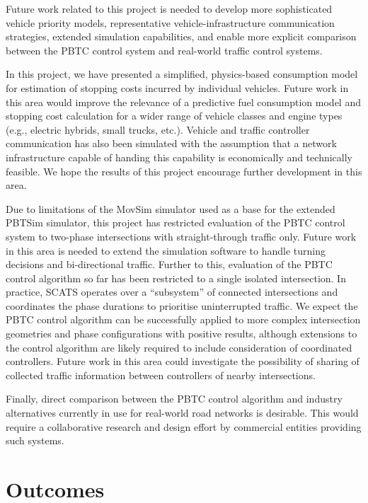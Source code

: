 Future work related to this project is needed to develop more sophisticated vehicle priority models, representative vehicle-infrastructure communication strategies, extended simulation capabilities, and enable more explicit comparison between the PBTC control system and real-world traffic control systems.

In this project, we have presented a simplified, physics-based consumption model for estimation of stopping costs incurred by individual vehicles. Future work in this area would improve the relevance of a predictive fuel consumption model and stopping cost calculation for a wider range of vehicle classes and engine types (e.g., electric hybrids, small trucks, etc.). Vehicle and traffic controller communication has also been simulated with the assumption that a network infrastructure capable of handing this capability is economically and technically feasible. We hope the results of this project encourage further development in this area.

Due to limitations of the MovSim simulator used as a base for the extended PBTSim simulator, this project has restricted evaluation of the PBTC control system to two-phase intersections with straight-through traffic only. Future work in this area is needed to extend the simulation software to handle turning decisions and bi-directional traffic. Further to this, evaluation of the PBTC control algorithm so far has been restricted to a single isolated intersection. In practice, SCATS operates over a ``subsystem'' of connected intersections and coordinates the phase durations to prioritise uninterrupted traffic. We expect the PBTC control algorithm can be successfully applied to more complex intersection geometries and phase configurations with positive results, although extensions to the control algorithm are likely required to include consideration of coordinated controllers. Future work in this area could investigate the possibility of sharing of collected traffic information between controllers of nearby intersections.

Finally, direct comparison between the PBTC control algorithm and industry alternatives currently in use for real-world road networks is desirable. This would require a collaborative research and design effort by commercial entities providing such systems.

\section{Outcomes}

